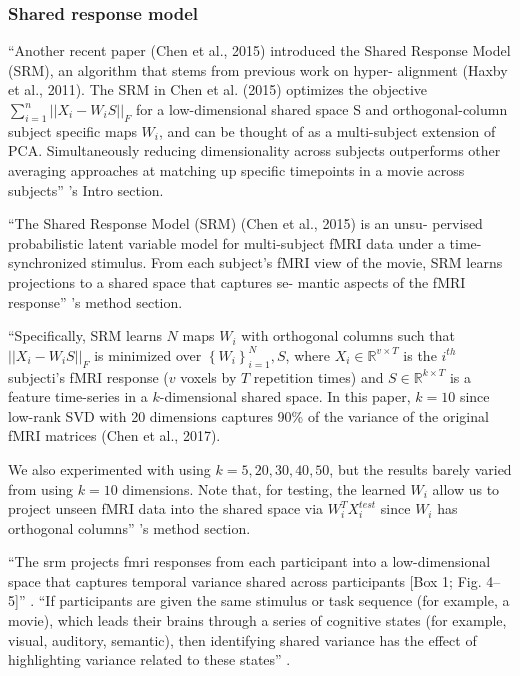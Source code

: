 \subsubsection{Shared response model}

``Another recent paper (Chen et al., 2015) introduced the Shared Response Model
(SRM), an algorithm that stems from previous work on hyper- alignment (Haxby et
al., 2011). The SRM in Chen et al. (2015) optimizes the objective
$\sum_{i=1}^{n}||X_{i}-W_{i}S||_{F}$ for a low-dimensional shared space S and
orthogonal-column subject specific maps $W_{i}$, and can be thought of as a
multi-subject extension of PCA.  Simultaneously reducing dimensionality across
subjects outperforms other averaging approaches at matching up speciﬁc
timepoints in a movie across subjects'' \citep{vodrahalli2018mapping}'s Intro
section.

``The Shared Response Model (SRM) (Chen et al., 2015) is an unsu- pervised
probabilistic latent variable model for multi-subject fMRI data under a
time-synchronized stimulus. From each subject’s fMRI view of the movie, SRM
learns projections to a shared space that captures se- mantic aspects of the
fMRI response'' \citep{vodrahalli2018mapping}'s method section.

``Specifically, SRM learns $N$ maps $W_{i}$ with orthogonal columns such that
%
$||X_{i}-W_{i}S||_{F}$ is minimized over
%
$\left\{ W_{i}\right\} _{i=1}^{N},S$, where
%
$X_{i}\in\mathbb{R}^{v\times{T}}$ is the $i^{th}$ subjecti's
%
fMRI response ($v$ voxels by $T$ repetition times) and
%
$S\in\mathbb{R}^{k\times{T}}$ is a feature time-series in a $k$-dimensional
shared space. In this paper, $k=10$ since low-rank SVD with 20 dimensions
captures 90\% of the variance of the original fMRI matrices (Chen et al., 2017).

We also experimented with using $k=5,20,30,40,50$, but the results barely varied
from using $k=10$ dimensions.
%
Note that, for testing, the learned $W_{i}$ allow us to project unseen fMRI data
into the shared space via $W_{i}^{T}X_{i}^{test}$ since $W_{i}$ has orthogonal
columns'' \citep{vodrahalli2018mapping}'s method section.



``The \ac{srm} \citep{chen2015reduced} projects \ac{fmri} responses from
each participant into a low-dimensional space that captures temporal variance
shared across participants [Box 1; Fig. 4–5]'' \citep{cohen2017computational}.
%
``If participants are given the same stimulus or task sequence (for example, a
movie), which leads their brains through a series of cognitive states (for
example, visual, auditory, semantic), then identifying shared variance has the
effect of highlighting variance related to these states''
\citep{cohen2017computational}.


